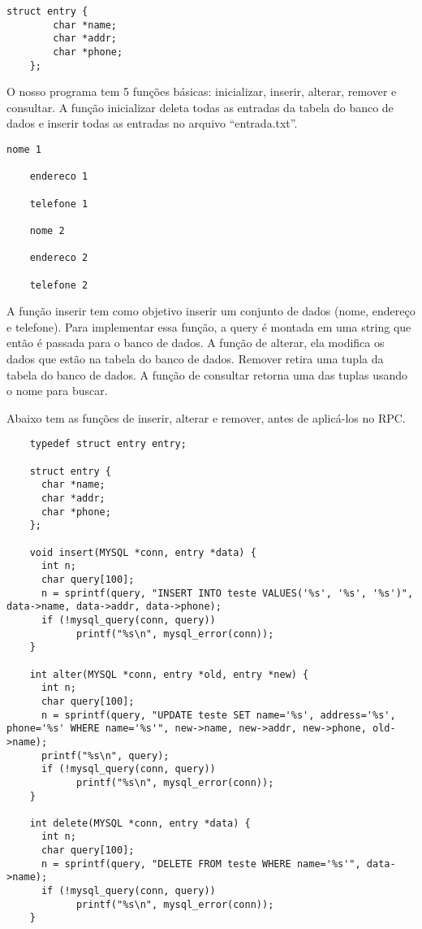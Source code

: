 \documentclass[12pt,a4paper]{article}
\begin{document}
\lstset{language=C}
\begin{lstlisting}[caption=Struct para organizar os dados]
	struct entry {
		char *name;
		char *addr;
		char *phone;
	};
\end{lstlisting}

O nosso programa tem 5 funções básicas: inicializar, inserir, alterar, remover e consultar.
A função inicializar deleta todas as entradas da tabela do banco de dados e inserir todas 
as entradas no arquivo ``entrada.txt''.

\begin{lstlisting}[caption=Formato do arquivo de entrada para a função inicializar]
	nome 1
	
	endereco 1
	
	telefone 1
	
	nome 2
	
	endereco 2
	
	telefone 2
\end{lstlisting}

A função inserir tem como objetivo inserir um conjunto de dados (nome, endereço e telefone).
Para implementar essa função, a query é montada em uma string que então é passada para o banco
de dados. A função de alterar, ela modifica os dados que estão na tabela do banco de dados.
Remover retira uma tupla da tabela do banco de dados. A função de consultar retorna uma das 
tuplas usando o nome para buscar.

Abaixo tem as funções de inserir, alterar e remover, antes de aplicá-los no RPC.

\lstset{language=C}
\begin{lstlisting}
	typedef struct entry entry;

	struct entry {
	  char *name;
	  char *addr; 
	  char *phone;
	};
	
	void insert(MYSQL *conn, entry *data) {
	  int n;
	  char query[100];
	  n = sprintf(query, "INSERT INTO teste VALUES('%s', '%s', '%s')", data->name, data->addr, data->phone);
	  if (!mysql_query(conn, query)) 
			printf("%s\n", mysql_error(conn));
	}

	int alter(MYSQL *conn, entry *old, entry *new) {
	  int n;
	  char query[100];
	  n = sprintf(query, "UPDATE teste SET name='%s', address='%s', phone='%s' WHERE name='%s'", new->name, new->addr, new->phone, old->name);
	  printf("%s\n", query);
	  if (!mysql_query(conn, query)) 
			printf("%s\n", mysql_error(conn));
	} 

	int delete(MYSQL *conn, entry *data) {
	  int n;
	  char query[100];
	  n = sprintf(query, "DELETE FROM teste WHERE name='%s'", data->name);
	  if (!mysql_query(conn, query)) 
			printf("%s\n", mysql_error(conn));
	}
\end{lstlisting}



\end{document}
